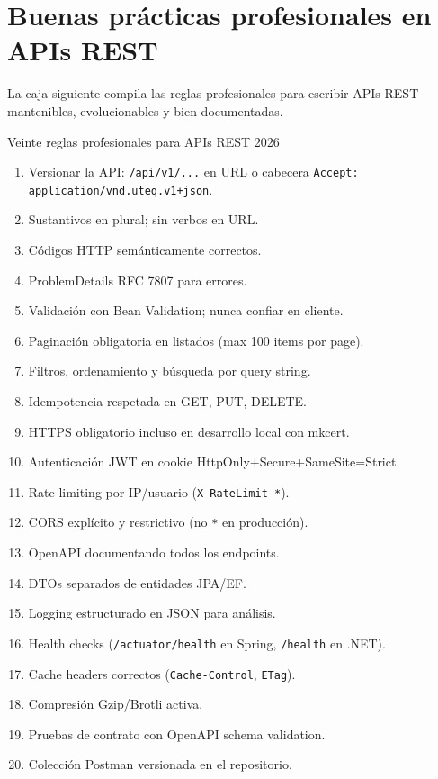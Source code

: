 \documentclass[11pt,a4paper,openany]{book}
\begin{document}
\section{Buenas prácticas profesionales en APIs REST}

La caja siguiente compila las reglas profesionales para
escribir APIs REST mantenibles, evolucionables y bien documentadas.


\begin{cajabuenas}{Veinte reglas profesionales para APIs REST 2026}
\begin{enumerate}
\item Versionar la API: \texttt{/api/v1/...} en URL o cabecera
\texttt{Accept: application/vnd.uteq.v1+json}.
\item Sustantivos en plural; sin verbos en URL.
\item Códigos HTTP semánticamente correctos.
\item ProblemDetails RFC 7807 para errores.
\item Validación con Bean Validation; nunca confiar en cliente.
\item Paginación obligatoria en listados (max 100 items por page).
\item Filtros, ordenamiento y búsqueda por query string.
\item Idempotencia respetada en GET, PUT, DELETE.
\item HTTPS obligatorio incluso en desarrollo local con mkcert.
\item Autenticación JWT en cookie HttpOnly+Secure+SameSite=Strict.
\item Rate limiting por IP/usuario (\texttt{X-RateLimit-*}).
\item CORS explícito y restrictivo (no \texttt{*} en producción).
\item OpenAPI documentando todos los endpoints.
\item DTOs separados de entidades JPA/EF.
\item Logging estructurado en JSON para análisis.
\item Health checks (\texttt{/actuator/health} en Spring,
\texttt{/health} en .NET).
\item Cache headers correctos (\texttt{Cache-Control}, \texttt{ETag}).
\item Compresión Gzip/Brotli activa.
\item Pruebas de contrato con OpenAPI schema validation.
\item Colección Postman versionada en el repositorio.
\end{enumerate}
\end{cajabuenas}
\end{document}
